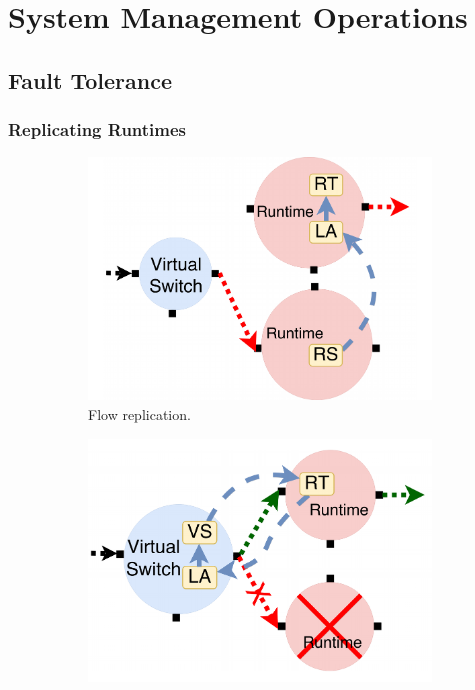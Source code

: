 \section{System Management Operations}
\label{sec:management}

\subsection{Fault Tolerance}
\label{sec:resilience}

\subsubsection{Replicating Runtimes}
\label{sec:replicating-runtime}
\begin{figure}[!h]
\begin{subfigure}[t]{0.49\linewidth}
   \centering
   \includegraphics[width=\columnwidth]{chap-nfvactor/figure/nfactor-replication.pdf}
   \caption{Flow replication.}\label{fig:rep}
  \end{subfigure}
  \begin{subfigure}[t]{0.49\linewidth}
     \centering
     \includegraphics[width=\columnwidth]{chap-nfvactor/figure/nfactor-recover.pdf}

\end{subfigure}
\end{figure}
